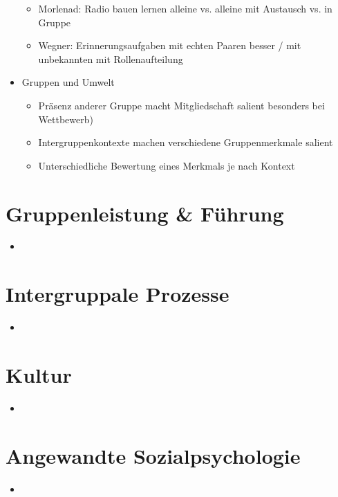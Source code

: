 \documentclass[11pt, paper=a4, twocolumn]{scrartcl}
\begin{document}
\begin{itemize}
\begin{itemize}
					\item Morlenad: Radio bauen lernen alleine vs. alleine mit Austausch vs. in Gruppe
					\item Wegner: Erinnerungsaufgaben mit echten Paaren besser / mit unbekannten mit Rollenaufteilung
				\end{itemize}
			\item Gruppen und Umwelt
				\begin{itemize}
					\item Präsenz anderer Gruppe macht Mitgliedschaft salient besonders bei Wettbewerb)
					\item Intergruppenkontexte machen verschiedene Gruppenmerkmale salient
					\item Unterschiedliche Bewertung eines Merkmals je nach Kontext
				\end{itemize}
		\end{itemize}

	\section{Gruppenleistung \& Führung}
		\begin{itemize}
			\item 
		\end{itemize}


	\section{Intergruppale Prozesse}
		\begin{itemize}
			\item
		\end{itemize}


	\section{Kultur}
		\begin{itemize}
			\item
		\end{itemize}

	\section{Angewandte Sozialpsychologie}
		\begin{itemize}
			\item 
		\end{itemize}
\end{document}
